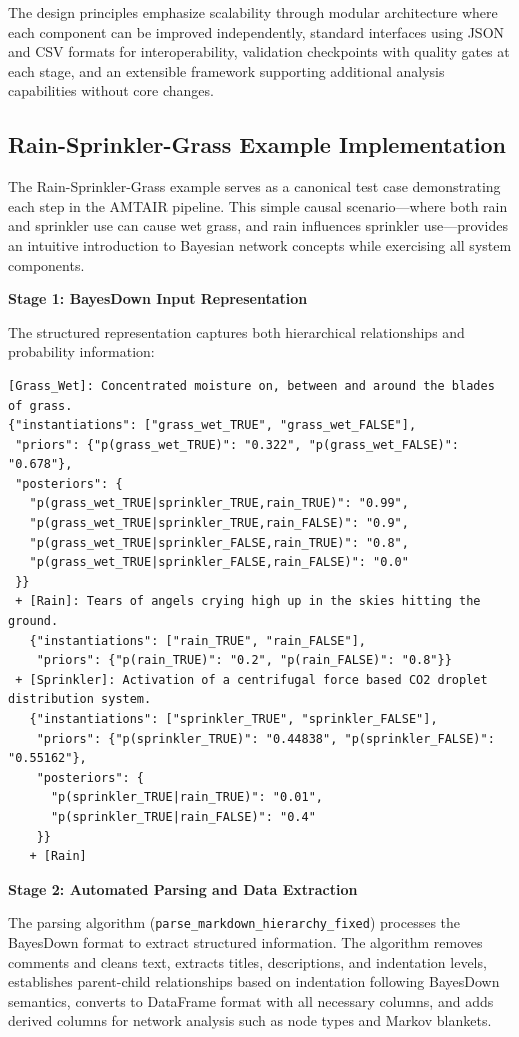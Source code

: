 \documentclass[
  11pt,
  letterpaper,
]{book}
\begin{document}
The design principles emphasize scalability through modular architecture
where each component can be improved independently, standard interfaces
using JSON and CSV formats for interoperability, validation checkpoints
with quality gates at each stage, and an extensible framework supporting
additional analysis capabilities without core changes.

\subsection{Rain-Sprinkler-Grass Example
Implementation}\label{sec-rain-sprinkler-grass}

The Rain-Sprinkler-Grass example serves as a canonical test case
demonstrating each step in the AMTAIR pipeline. This simple causal
scenario---where both rain and sprinkler use can cause wet grass, and
rain influences sprinkler use---provides an intuitive introduction to
Bayesian network concepts while exercising all system components.

\textbf{Stage 1: BayesDown Input Representation}

The structured representation captures both hierarchical relationships
and probability information:

\begin{verbatim}
[Grass_Wet]: Concentrated moisture on, between and around the blades of grass. 
{"instantiations": ["grass_wet_TRUE", "grass_wet_FALSE"], 
 "priors": {"p(grass_wet_TRUE)": "0.322", "p(grass_wet_FALSE)": "0.678"},
 "posteriors": {
   "p(grass_wet_TRUE|sprinkler_TRUE,rain_TRUE)": "0.99",
   "p(grass_wet_TRUE|sprinkler_TRUE,rain_FALSE)": "0.9",
   "p(grass_wet_TRUE|sprinkler_FALSE,rain_TRUE)": "0.8", 
   "p(grass_wet_TRUE|sprinkler_FALSE,rain_FALSE)": "0.0"
 }}
 + [Rain]: Tears of angels crying high up in the skies hitting the ground.
   {"instantiations": ["rain_TRUE", "rain_FALSE"],
    "priors": {"p(rain_TRUE)": "0.2", "p(rain_FALSE)": "0.8"}}
 + [Sprinkler]: Activation of a centrifugal force based CO2 droplet distribution system.
   {"instantiations": ["sprinkler_TRUE", "sprinkler_FALSE"], 
    "priors": {"p(sprinkler_TRUE)": "0.44838", "p(sprinkler_FALSE)": "0.55162"},
    "posteriors": {
      "p(sprinkler_TRUE|rain_TRUE)": "0.01",
      "p(sprinkler_TRUE|rain_FALSE)": "0.4"
    }}
   + [Rain]
\end{verbatim}

\textbf{Stage 2: Automated Parsing and Data Extraction}

The parsing algorithm (\texttt{parse\_markdown\_hierarchy\_fixed})
processes the BayesDown format to extract structured information. The
algorithm removes comments and cleans text, extracts titles,
descriptions, and indentation levels, establishes parent-child
relationships based on indentation following BayesDown semantics,
converts to DataFrame format with all necessary columns, and adds
derived columns for network analysis such as node types and Markov
blankets.
\end{document}
